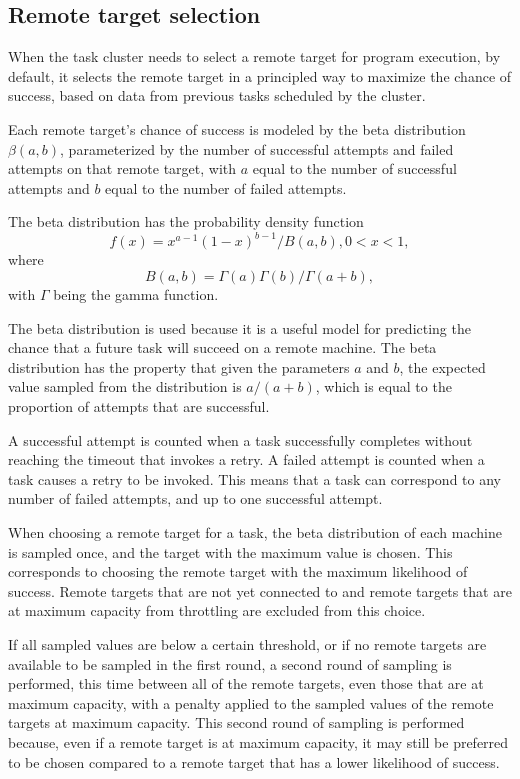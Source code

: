 \documentclass[oneside]{report}
\begin{document}
\subsection{Remote target selection}
When the task cluster needs to select a remote target for program execution, by default, it selects the remote target in a principled way to maximize the chance of success, based on data from previous tasks scheduled by the cluster.

Each remote target's chance of success is modeled by the beta distribution $\beta(a, b)$, parameterized by the number of successful attempts and failed attempts on that remote target, with $a$ equal to the number of successful attempts and $b$ equal to the number of failed attempts.

The beta distribution has the probability density function
$$ f(x) = x^{a-1}(1-x)^{b-1} / B(a, b), 0 < x < 1,$$
where
$$ B(a, b) = \Gamma(a)\Gamma(b) / \Gamma(a+b), $$
with $\Gamma$ being the gamma function.

The beta distribution is used because it is a useful model for predicting the chance that a future task will succeed on a remote machine.
The beta distribution has the property that given the parameters $a$ and $b$, the expected value sampled from the distribution is $a/(a+b)$, which is equal to the proportion of attempts that are successful.

A successful attempt is counted when a task successfully completes without reaching the timeout that invokes a retry.
A failed attempt is counted when a task causes a retry to be invoked.
This means that a task can correspond to any number of failed attempts, and up to one successful attempt.

When choosing a remote target for a task, the beta distribution of each machine is sampled once, and the target with the maximum value is chosen.
This corresponds to choosing the remote target with the maximum likelihood of success.
Remote targets that are not yet connected to and remote targets that are at maximum capacity from throttling are excluded from this choice.

If all sampled values are below a certain threshold, or if no remote targets are available to be sampled in the first round, a second round of sampling is performed, this time between all of the remote targets, even those that are at maximum capacity, with a penalty applied to the sampled values of the remote targets at maximum capacity.
This second round of sampling is performed because, even if a remote target is at maximum capacity, it may still be preferred to be chosen compared to a remote target that has a lower likelihood of success.
\end{document}
